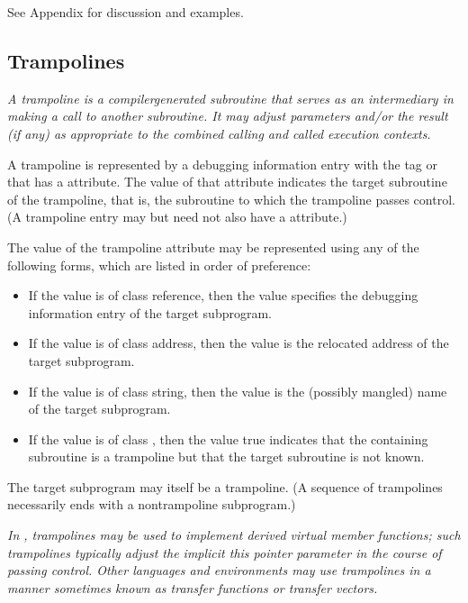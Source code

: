 See Appendix  
for discussion and examples.

\subsection{Trampolines}
\label{chap:trampolines}

\textit{A trampoline is a compiler\dash generated subroutine that serves as
\hypertarget{chap:DWATtrampolinetargetsubroutine}{}
an intermediary in making a call to another subroutine. It may
adjust parameters and/or the result (if any) as appropriate
to the combined calling and called execution contexts.}

A trampoline is represented by a debugging information entry
with the tag \DWTAGsubprogram{} or \DWTAGinlinedsubroutine{}
that has 
a \DWATtrampoline{} attribute. 
The value of that
attribute indicates the target subroutine of the trampoline,
that is, the subroutine to which the trampoline passes
control. (A trampoline entry may but need not also have a
\DWATartificial{} attribute.)

The value of the trampoline attribute may be represented
using any of the following forms, which are listed in order
of preference:

\begin{itemize}
\item If the value is of class reference, then the value
specifies the debugging information entry of the target
subprogram.

\item If the value is of class address, then the value is
the relocated address of the target subprogram.

\item If the value is of class string, then the value is the
(possibly mangled) 
name of the target subprogram.

\item If the value is of class , then the value true
indicates that the containing subroutine is a trampoline but
that the target subroutine is not known.
\end{itemize}


The target subprogram may itself be a trampoline. (A sequence
of trampolines necessarily ends with a non\dash trampoline
subprogram.)

\textit{In , trampolines may be used 
to implement derived virtual
member functions; such trampolines typically adjust the
implicit this pointer parameter in the course of passing
control.  
Other languages and environments may use trampolines
in a manner sometimes known as transfer functions or transfer
vectors.}

